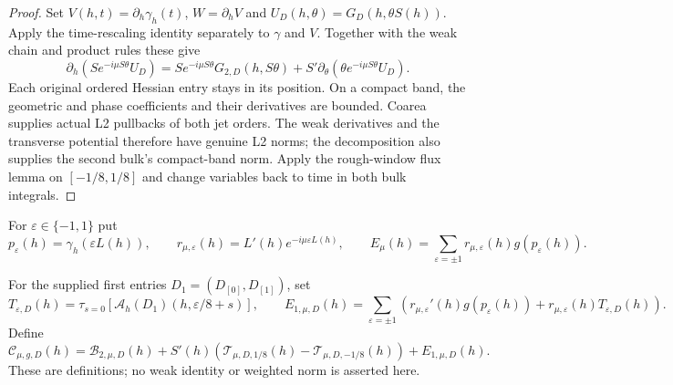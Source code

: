 \begin{proof}
\leanok
Set $V(h,t)=\partial_h\gamma_h(t)$, $W=\partial_hV$ and
$U_D(h,\theta)=G_D(h,\theta S(h))$.
Apply the time-rescaling identity separately to $\gamma$ and $V$.
Together with the weak chain and product rules these give
\[
 \partial_h\!\left(Se^{-i\mu S\theta}U_D\right)
 =Se^{-i\mu S\theta}G_{2,D}(h,S\theta)
   +S'\partial_\theta\!\left(\theta e^{-i\mu S\theta}U_D\right).
\]
Each original ordered Hessian entry stays in its position.
On a compact band, the geometric and phase coefficients and their derivatives
are bounded. Coarea supplies actual L2 pullbacks of both jet orders.
The weak derivatives and the transverse potential therefore have genuine
L2 norms; the decomposition also supplies the second bulk's compact-band norm.
Apply the rough-window flux lemma on $[-1/8,1/8]$ and change variables
back to time in both bulk integrals.
\end{proof}

\begin{definition}
\label{def:numerator-endpoint-flux}
\leanok
For $\varepsilon\in\{-1,1\}$ put
\[
 p_\varepsilon(h)=\gamma_h(\varepsilon L(h)),\qquad
 r_{\mu,\varepsilon}(h)=L'(h)e^{-i\mu\varepsilon L(h)},\qquad
 E_\mu(h)=\sum_{\varepsilon=\pm1}
    r_{\mu,\varepsilon}(h)g(p_\varepsilon(h)).
\]
\end{definition}

\begin{definition}
\label{def:numerator-second-derivative}
\leanok
For the supplied first entries $D_1=(D_{[0]},D_{[1]})$, set
\[
 T_{\varepsilon,D}(h)=\tau_{s=0}
   [\mathcal A_h(D_1)(h,\varepsilon/8+s)],
 \qquad
 E_{1,\mu,D}(h)=\sum_{\varepsilon=\pm1}
 \left(r_{\mu,\varepsilon}'(h)g(p_\varepsilon(h))
       +r_{\mu,\varepsilon}(h)T_{\varepsilon,D}(h)\right).
\]
Define
\[
 \mathcal C_{\mu,g,D}(h)=\mathcal B_{2,\mu,D}(h)
   +S'(h)(\mathcal T_{\mu,D,1/8}(h)-\mathcal T_{\mu,D,-1/8}(h))
   +E_{1,\mu,D}(h).
\]
These are definitions; no weak identity or weighted norm is asserted here.
\end{definition}

